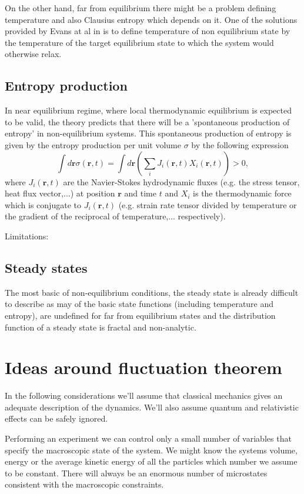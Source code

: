 \documentclass[a4paper,12pt,nofootinbib]{article}
\begin{document}
On the other hand, far from equilibrium there might be a problem defining temperature and also Clausius entropy which depends on it. One of the solutions provided by Evans at al in  is to define temperature of non equilibrium state by the temperature of the target equilibrium state to which the system would otherwise relax.

\subsection{Entropy production}

In near equilibrium regime, where local thermodynamic equilibrium is expected to be valid, the theory predicts that there will be a 'spontaneous production of entropy' in non-equilibrium systems.
This spontaneous production of entropy is given by the entropy production per unit volume $\sigma$ by the following expression \cite{DeGroot:1984ue}
\begin{displaymath}
  \int d\bm{r} \sigma(\bm{r},t)=\int d\bm{r}(\sum_i J_i(\bm{r},t)X_i(\bm{r},t))>0,
\end{displaymath}
where $J_i(\bm{r},t)$ are the Navier-Stokes hydrodynamic fluxes (e.g. the stress tensor, heat flux vector,...) at position $\bm{r}$ and time $t$ and $X_i$ is the thermodynamic force which is conjugate to $J_i(\bm{r},t)$ (e.g. strain rate tensor divided by temperature or the gradient of the reciprocal of temperature,... respectively).

Limitations:

\subsection{Steady states}
The most basic of non-equilibrium conditions, the steady state is already difficult to describe as may of the basic state functions (including temperature and entropy), are undefined for far from equilibrium states and the distribution function of a steady state is fractal and non-analytic. 


\section{Ideas around fluctuation theorem}
In the following considerations we'll assume that classical mechanics gives an adequate description of the dynamics.
We'll also assume quantum and relativistic effects can be safely ignored.

Performing an experiment we can control only a small number of variables that specify the macroscopic state of the system. We might know the systems volume, energy or the average kinetic energy of all the particles which number we assume to be constant. There will always be an enormous number of microstates consistent with the macroscopic constraints.
\end{document}
